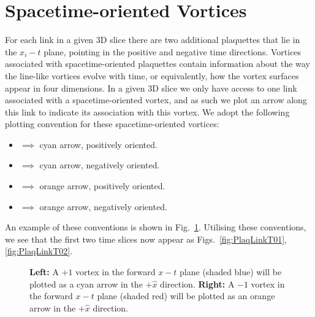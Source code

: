 \section{Spacetime-oriented Vortices}
For each link in a given 3D slice there are two additional plaquettes that lie in the $x_i - t$ plane, pointing in the positive and negative time directions. Vortices associated with spacetime-oriented plaquettes contain information about the way the line-like vortices evolve with time, or equivalently, how the vortex surfaces appear in four dimensions. In a given 3D slice we only have access to one link associated with a spacetime-oriented vortex, and as such we plot an arrow along this link to indicate its association with this vortex. We adopt the following plotting convention for these spacetime-oriented vortices:
\begin{itemize}[leftmargin=*,itemsep=0pt,labelsep=12pt]
\item  {}  $\implies$ cyan arrow, positively oriented.
\item  {} $\implies$ cyan arrow, negatively oriented.
\item  {}  $\implies$ orange arrow, positively oriented.
\item  {} $\implies$ orange arrow, negatively oriented.
\end{itemize}
An example of these conventions is shown in Fig.~\ref{fig:TimeVortices}. Utilising these conventions, we see that the first two time slices now appear as Figs.~\ref{fig:PlaqLinkT01}, \ref{fig:PlaqLinkT02}.\\
%
\begin{figure}[H]
\centering
  \begin{subfigure}[t]{0.45\textwidth}
  \centering
  
  \end{subfigure}
  \hfill
  \begin{subfigure}[t]{0.45\textwidth}
  \centering
  
  \end{subfigure}             
  \caption[Example of the plotting convention used for spacetime-oriented vortices.]{\textbf{Left:} A $+1$ vortex in the forward $x-t$ plane (shaded blue) will be plotted as a cyan arrow in the $+\hat{x}$ direction. \textbf{Right:} A $-1$ vortex in the forward $x-t$ plane (shaded red) will be plotted as an orange arrow in the $+\hat{x}$ direction.}
  \label{fig:TimeVortices}
\end{figure}
